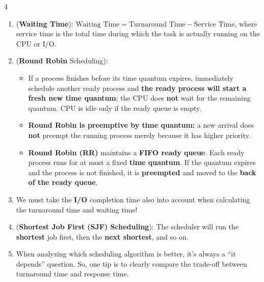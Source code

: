 \documentclass[10pt, landscape]{article}
\begin{document}
\begin{multicols}{4}
\begin{enumerate}
    \item (\textbf{Waiting Time}): $\text{Waiting Time}=\text{Turnaround Time}-\text{Service Time}$, where service time is the total time during which the task is actually running on the CPU or I/O.
    \item (\textbf{Round Robin} Scheduling): 
    \begin{itemize}
        \item If a process finishes before its time quantum expires, immediately schedule another ready process and \textbf{the ready process will start a fresh new time quantum}; the CPU does \textbf{not} wait for the remaining quantum. CPU is idle only if the ready queue is empty.
        \item \textbf{Round Robin is preemptive by time quantum:} a new arrival does \textbf{not} preempt the running process merely because it has higher priority.
        \item \textbf{Round Robin (RR)} maintains a \textbf{FIFO ready queue}. Each ready process runs for at most a fixed \textbf{time quantum}. If the quantum expires and the process is not finished, it is \textbf{preempted} and moved to the \textbf{back of the ready queue}.
    \end{itemize}
    \item We must take the \textbf{I/O} completion time also into account when calculating the turnaround time and waiting time!
    \item (\textbf{Shortest Job First (SJF) Scheduling}): The scheduler will run the \textbf{shortest} job first, then the \textbf{next shortest}, and so on.
    \item When analyzing which scheduling algorithm is better, it's always a ``it depends'' question. So, one tip is to clearly compare the trade-off between turnaround time and response time.
\end{enumerate}


\end{multicols}
\end{document}
